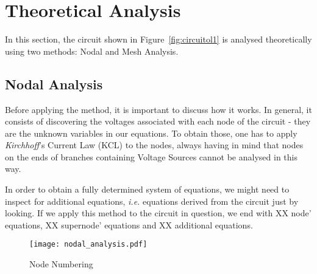 \section{Theoretical Analysis}
\label{sec:analysis}

In this section, the circuit shown in Figure~\ref{fig:circuitol1} is analysed
theoretically using two methods: Nodal and Mesh Analysis.

\subsection{Nodal Analysis} 
\label{subsec:node_analysis} 

Before applying the method, it is important to discuss how it works. In general, it consists of discovering the voltages associated with each node of the circuit - they are the unknown variables in our equations. To obtain those, one has to apply \textit{Kirchhoff}'s Current Law (KCL) to the nodes, always having in mind that nodes on the ends of branches containing  Voltage Sources cannot be analysed in this way.

In order to obtain a fully determined system of equations, we might need to inspect for additional equations, \textit{i.e.} equations derived from the circuit just by looking. If we apply this method to the circuit in question, we end with XX node' equations, XX supernode' equations and XX additional equations.

\begin{figure}[h] \centering
\texttt{[image: nodal\_analysis.pdf]}
\caption{Node Numbering}
\label{fig:node_numbering}
\end{figure}

